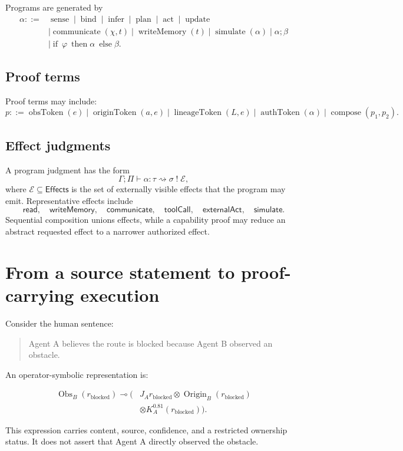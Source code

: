 \documentclass[11pt]{article}
\theoremstyle{definition}
\theoremstyle{remark}
\newcommand{\Origin}{\operatorname{Origin}}
\newcommand{\Obs}{\operatorname{Obs}}
\newcommand{\Effects}{\mathsf{Effects}}
\begin{document}
Programs are generated by
\[
\begin{aligned}
\alpha::={}&
\operatorname{sense}
\mid\operatorname{bind}
\mid\operatorname{infer}
\mid\operatorname{plan}
\mid\operatorname{act}
\mid\operatorname{update}\\
&\mid\operatorname{communicate}(\chi,t)
\mid\operatorname{writeMemory}(t)
\mid\operatorname{simulate}(\alpha)
\mid\alpha;\beta\\
&\mid\operatorname{if}\ \varphi\ \operatorname{then}\alpha\ \operatorname{else}\beta.
\end{aligned}
\]

\subsection{Proof terms}

Proof terms may include:
\[
p::=
\operatorname{obsToken}(e)
\mid\operatorname{originToken}(a,e)
\mid\operatorname{lineageToken}(L,e)
\mid\operatorname{authToken}(\alpha)
\mid\operatorname{compose}(p_1,p_2).
\]

\subsection{Effect judgments}

A program judgment has the form
\[
\Gamma;\Pi\vdash
\alpha:\tau\rightsquigarrow\sigma\;!\;\mathcal E,
\]
where \(\mathcal E\subseteq\Effects\) is the set of externally visible effects that the program may emit. Representative effects include
\[
\mathsf{read},\quad
\mathsf{writeMemory},\quad
\mathsf{communicate},\quad
\mathsf{toolCall},\quad
\mathsf{externalAct},\quad
\mathsf{simulate}.
\]
Sequential composition unions effects, while a capability proof may reduce an abstract requested effect to a narrower authorized effect.



\section{From a source statement to proof-carrying execution}

Consider the human sentence:
\begin{quote}
Agent A believes the route is blocked because Agent B observed an obstacle.
\end{quote}
An operator-symbolic representation is:
\begin{syntaxbox}
\begin{align*}
\Obs_B(r_{\mathrm{blocked}})
\multimap
\bigl(&J_A r_{\mathrm{blocked}}
\otimes
\Origin_B(r_{\mathrm{blocked}})\\
&\otimes
K_A^{0.81}(r_{\mathrm{blocked}})
\bigr).
\end{align*}
\end{syntaxbox}
This expression carries content, source, confidence, and a restricted ownership status. It does not assert that Agent A directly observed the obstacle.
\end{document}
